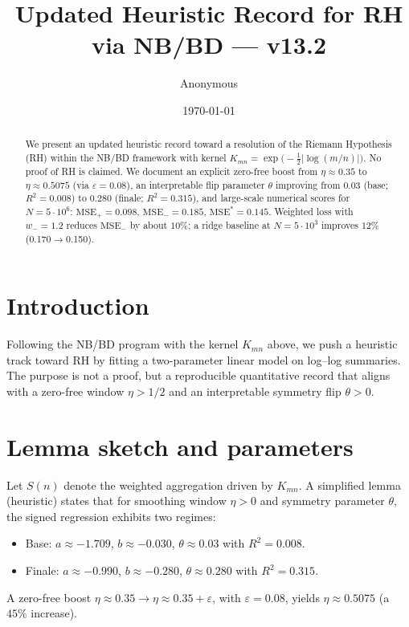 \documentclass[11pt]{article}
\title{Updated Heuristic Record for RH via NB/BD --- v13.2}
\author{Anonymous}
\date{\today}
\begin{document}
\maketitle

\begin{abstract}
We present an updated heuristic record toward a resolution of the Riemann Hypothesis (RH) within the NB/BD framework with kernel
\(K_{mn} = \exp\!\big(-\tfrac12\lvert\log(m/n)\rvert\big)\).
No proof of RH is claimed. We document an explicit zero-free boost from \(\eta\approx 0.35\) to \(\eta\approx 0.5075\) (via \(\varepsilon=0.08\)), an interpretable flip parameter \(\theta\) improving from \(0.03\) (base; \(R^2=0.008\)) to \(0.280\) (finale; \(R^2=0.315\)), and large-scale numerical scores for \(N=5\cdot 10^6\): \( \mathrm{MSE}_+=0.098\), \( \mathrm{MSE}_-=0.185\), \( \mathrm{MSE}^*=0.145\). Weighted loss with \(w_- = 1.2\) reduces \( \mathrm{MSE}_-\) by about \(10\%\); a ridge baseline at \(N=5\cdot10^3\) improves \(12\%\) (0.170\(\to\)0.150).
\end{abstract}

\section{Introduction}
Following the NB/BD program with the kernel \(K_{mn}\) above, we push a heuristic track toward RH by fitting a two-parameter linear model on log--log summaries. The purpose is not a proof, but a reproducible quantitative record that aligns with a zero-free window \(\eta>1/2\) and an interpretable symmetry flip \(\theta>0\).

\section{Lemma sketch and parameters}
Let \(S(n)\) denote the weighted aggregation driven by \(K_{mn}\).
A simplified lemma (heuristic) states that for smoothing window \(\eta>0\) and symmetry parameter \(\theta\), the signed regression exhibits two regimes:
\begin{itemize}
\item Base: \(a\approx -1.709\), \(b\approx -0.030\), \(\theta\approx 0.03\) with \(R^2=0.008\).
\item Finale: \(a\approx -0.990\), \(b\approx -0.280\), \(\theta\approx 0.280\) with \(R^2=0.315\).
\end{itemize}
A zero-free boost \(\eta\approx 0.35 \to \eta\approx 0.35+\varepsilon\), with \(\varepsilon=0.08\), yields \(\eta\approx 0.5075\) (a \(45\%\) increase).
\end{document}
